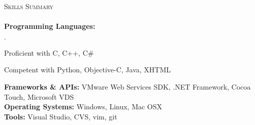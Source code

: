 \documentclass{article}
\newcommand{\mydot}{$\cdot$}
\newcommand{\lineunder}{\vspace*{-8pt} \\ \hspace*{-18pt} \hrulefill \\}
\newcommand{\header}[1]{{\hspace*{-15pt}\vspace*{6pt} \textsc{#1}} \vspace*{-6pt} \lineunder}
\newenvironment{achievements}{\begin{list}{\mydot}{\topsep 0pt \itemsep -2pt}}{\vspace*{4pt}\end{list}}
\begin{document}

\header{Skills Summary}
\textbf{Programming Languages:} 
\begin{achievements}
  \item Proficient with C, C++, C\#
  \item Competent with Python, Objective-C, Java, XHTML
\end{achievements}
\vspace{-3pt}

\textbf{Frameworks \& APIs:} VMware Web Services SDK, .NET Framework, Cocoa Touch, Microsoft VDS\\

\textbf{Operating Systems:} Windows, Linux, Mac OSX\\

\textbf{Tools:} Visual Studio, CVS, vim, git\\
\end{document}
